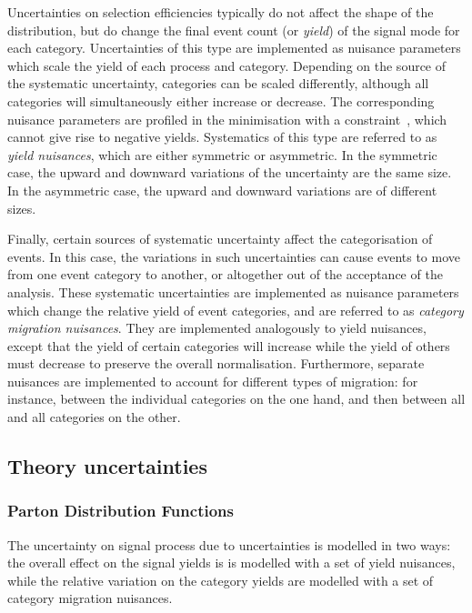 Uncertainties on selection efficiencies typically do not affect the shape of the \mgg distribution, but do change the final event count (or \emph{yield}) of the signal mode for each category. Uncertainties of this type are implemented as nuisance parameters which scale the yield of each process and category. Depending on the source of the systematic uncertainty, categories can be scaled differently, although all categories will simultaneously either increase or decrease. The corresponding nuisance parameters are profiled in the \NLL minimisation with a \lnN constraint~\cite{}, which cannot give rise to negative yields. Systematics of this type are referred to as \emph{yield nuisances}, which are either symmetric or asymmetric. In the symmetric case, the upward and downward variations of the uncertainty are the same size. In the asymmetric case, the upward and downward variations are of different sizes.

Finally, certain sources of systematic uncertainty affect the categorisation of events. In this case, the variations in such uncertainties can cause events to move from one event category to another, or altogether out of the acceptance of the analysis. These systematic uncertainties are implemented as nuisance parameters which change the relative yield of event categories, and are referred to as \emph{category migration nuisances}. They are implemented analogously to yield nuisances, except that the yield of certain categories will increase while the yield of others must decrease to preserve the overall normalisation. Furthermore, separate nuisances are implemented to account for different types of migration: for instance, between the individual \VBFTag categories on the one hand, and then between all \VBFTag and all \Untagged categories on the other.

\subsection{Theory uncertainties}

\subsubsection{Parton Distribution Functions}

The uncertainty on signal process \crosssection\s due to \PDF uncertainties is modelled in two ways: the overall effect on the signal yields is is modelled with a set of yield nuisances, while the relative variation on the category yields are modelled with a set of category migration nuisances. 

